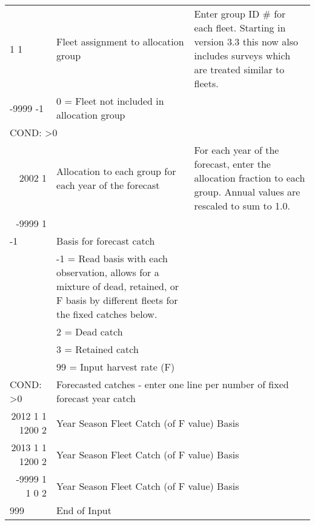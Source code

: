 \begin{landscape}
\begin{longtable}{p{3cm} p{7cm} p{11cm}}
  \hline
  1 1  & Fleet assignment to allocation group & \multirow{1}{1cm}[-0.1cm]{\parbox{11cm}{Enter group ID \# for each fleet. Starting in version 3.3 this now also includes surveys which are treated similar to fleets.}} \\
  -9999 -1  & 0 = Fleet not included in allocation group & \\
    
  \hline
  \multicolumn{3}{l}{COND: >0 } \\
  \multicolumn{1}{r}{2002 1}  & Allocation to each group for each year of the forecast & For each year of the forecast, enter the allocation fraction to each group.  Annual values are rescaled to sum to 1.0. \\
  \multicolumn{1}{r}{-9999 1} & \\
  
  
  \hline
  -1 & Basis for forecast catch & \\
    & -1 = Read basis with each observation, allows for a mixture of dead, retained, or F basis by different fleets for the fixed catches below.\\
    & 2 = Dead catch & \\
    & 3 = Retained catch & \\
    & 99 = Input harvest rate (F) & \\
    
  \hline
  \multicolumn{1}{l}{COND: >0 }& \multicolumn{2}{l}{Forecasted catches - enter one line per number of fixed forecast year catch }\\
  \multicolumn{1}{r}{2012 1 1 1200 2}  & \multicolumn{2}{l}{Year Season Fleet Catch (of F value) Basis}  \\
  \multicolumn{1}{r}{2013 1 1 1200 2}  & \multicolumn{2}{l}{Year Season Fleet Catch (of F value) Basis}  \\
  \multicolumn{1}{r}{-9999 1 1 0   2}  & \multicolumn{2}{l}{Year Season Fleet Catch (of F value) Basis}  \\
  
  \hline
  999 & End of Input & \\

 
 
  \end{longtable}
\end{landscape}